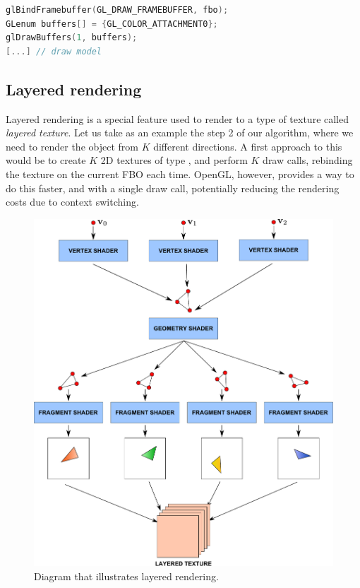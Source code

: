 \begin{lstlisting}[language=C++,label=lst:rendertotexturerender,caption={Render to texture example, rendering phase. Since we have not configured and FBO for depth and stencil buffers, depth testing and stencil should be disabled at this point.}]
glBindFramebuffer(GL_DRAW_FRAMEBUFFER, fbo);
GLenum buffers[] = {GL_COLOR_ATTACHMENT0};
glDrawBuffers(1, buffers);
[...] // draw model
\end{lstlisting}

\subsection{Layered rendering}
Layered rendering is a special feature used to render to a type of texture called \emph{layered texture}. Let us take as an example the step 2 of our algorithm, where we need to render the object from $K$ different directions. A first approach to this would be to create $K$ 2D textures of type , and perform $K$ draw calls, rebinding the texture on the current FBO each time. OpenGL, however, provides a way to do this faster, and with a single draw call, potentially reducing the rendering costs due to context switching.

\begin{figure}[!ht]
\centering
\includegraphics[width=\linewidth]{images/method/layered.pdf}
\caption{Diagram that illustrates layered rendering.}
\label{fig:layered}
\end{figure} 

